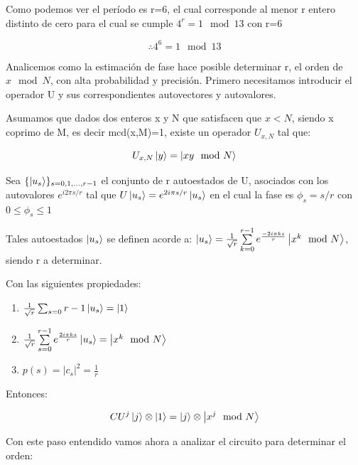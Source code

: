  Como podemos ver el período es r=6, el cual corresponde al menor r entero distinto de cero para el cual se cumple $4^r=1 \mod 13$ con r=6

 $$\therefore 4^6 = 1 \mod 13$$

Analicemos como la estimación de fase hace posible determinar r, el orden de $x \mod N$, con alta probabilidad y precisión. Primero necesitamos introducir el operador U y sus correspondientes autovectores y autovalores.

Asumamos que dados dos enteros x y N que satisfacen que $x<N$, siendo x coprimo de M, es decir mcd(x,M)=1, existe un operador $U_{x,N}$ tal que:

\begin{equation}
    U_{x,N} \ket{y} = \ket{x y \mod N}
\end{equation}

Sea $\{ \ket{u_s}\}_{s = 0, 1, ..., r-1}$ el conjunto de r autoestados de U, asociados con los autovalores $e^{i 2 \pi s/r}$ tal que $U \ket{u_s} = e^{2 i \pi s /r} \ket{u_s}$ en el cual la fase es $\phi_s = s/r$ con $0 \leq \phi_s \leq 1$

Tales autoestados $\ket{u_s}$ se definen acorde a: $\ket{u_s} = \frac{1}{\sqrt{r}} \sum\limits_{k=0}^{r-1} e^{\frac{-2 i \pi k s}{r}} \ket{x^k \mod N}$, siendo r a determinar.

Con las siguientes propiedades:

\begin{enumerate}
    \item $\frac{1}{\sqrt{r}} \sum_{s=0}{r-1} \ket{u_s} = \ket{1}$
    \item $\frac{1}{\sqrt{r}} \sum\limits_{s=0}^{r-1} e^{\frac{2 i \pi k s}{r}} \ket{u_s} = \ket{x^k \mod N}$
    \item $p(s) = |c_s|^2 = \frac{1}{r}$
\end{enumerate}

Entonces:

\begin{equation}
    CU^j \ket{j} \otimes \ket{1} = \ket{j} \otimes \ket{x^j \mod N}
\end{equation}

Con este paso entendido vamos ahora a analizar el circuito para determinar el orden:

